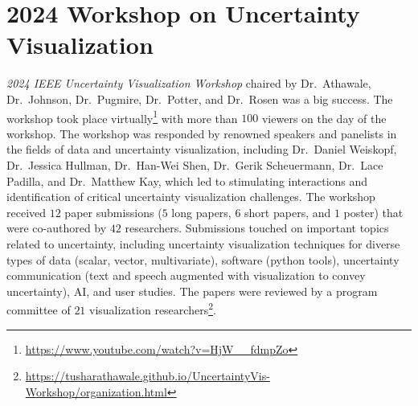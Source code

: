 \section{2024 Workshop on Uncertainty Visualization}
{\em 2024 IEEE Uncertainty Visualization Workshop} chaired by Dr.~Athawale, Dr.~Johnson, Dr.~Pugmire, Dr.~Potter, and Dr.~Rosen was a big success. The workshop took place virtually\footnote{\tiny\url{https://www.youtube.com/watch?v=HjW__fdmpZo}} with more than $100$ viewers on the day of the workshop. The workshop was responded by renowned speakers and panelists in the fields of data and uncertainty visualization, including Dr.~Daniel Weiskopf, Dr.~Jessica Hullman, Dr.~Han-Wei Shen, Dr.~Gerik Scheuermann, Dr.~Lace Padilla, and Dr.~Matthew Kay, which led to stimulating interactions and identification of critical uncertainty visualization challenges. The workshop received $12$ paper submissions ($5$ long papers, $6$ short papers, and $1$ poster) that were co-authored by $42$ researchers. Submissions touched on important topics related to uncertainty, including uncertainty visualization techniques for diverse types of data (scalar, vector, multivariate), software (python tools), uncertainty communication (text and speech augmented with visualization to convey uncertainty), AI, and user studies. The papers were reviewed by a program committee of $21$ visualization researchers\footnote{\tiny\url{https://tusharathawale.github.io/UncertaintyVis-Workshop/organization.html}}.